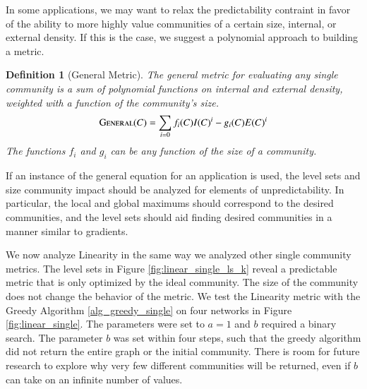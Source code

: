 \documentclass[phd,tocprelim]{cornell}
\newtheorem{definition}{Definition}
\begin{document}
In some applications, we may want to relax the predictability contraint in favor of the ability to more highly value communities of a certain size, internal, or external density.  If this is the case, we suggest a polynomial approach to building a metric.
\begin{definition}[General Metric] The general metric for evaluating any single community is a sum of polynomial functions on internal and external density, weighted with a function of the community's size.
  \begin{equation}
   \mbox{\sc General}(C) = \sum\limits_{i = 0} f_i(C) I(C)^i - g_i(C) E(C)^i
  \end{equation}
The functions $f_i$ and $g_i$ can be any function of the size of a community.
\end{definition}
If an instance of the general equation for an application is used, the level sets and size community impact should be analyzed for elements of unpredictability.  In particular, the local and global maximums should correspond to the desired communities, and the level sets should aid finding desired communities in a manner similar to gradients.

We now analyze {\sc Linearity} in the same way we analyzed other single community metrics.  The level sets in Figure \ref{fig:linear_single_ls_k} reveal a predictable metric that is only optimized by the ideal community. The size of the community does not change the behavior of the metric.  We test the {\sc Linearity} metric  with the Greedy Algorithm \ref{alg_greedy_single} on four networks in Figure \ref{fig:linear_single}.  The parameters were set to $a = 1$ and $b$ required a binary search.  The parameter $b$ was set within four steps, such that the greedy algorithm did not return the entire graph or the initial community. There is room for future research to explore why very few different communities will be returned, even if $b$ can take on an infinite number of values.
\end{document}
